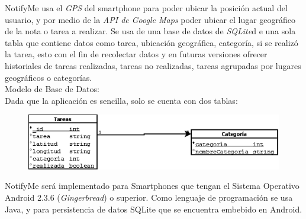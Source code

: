 \documentclass[a4paper,11pt]{article}
\begin{document}
NotifyMe usa el \emph{GPS} del smartphone para poder ubicar la posición actual del usuario, y por medio de la \emph{API de Google Maps} poder ubicar el lugar geográfico de la nota o tarea a realizar. Se usa de una base de datos de \emph{SQLite}d e una sola tabla que contiene datos como tarea, ubicación geográfica, categoría, si se realizó la tarea, esto con el fin de recolectar datos y en futuras versiones ofrecer historiales de tareas realizadas, tareas no realizadas, tareas agrupadas por lugares geográficos o categorías. \\
 
Modelo de Base de Datos: \\

Dada que la aplicación es sencilla, solo se cuenta con dos tablas: \\

\begin{figure}[h]
\centering
\includegraphics[width=0.7\linewidth]{./DB}
\caption{}
\label{fig 1: Modelo ER de Base de Datos de NotifyMe}
\end{figure}

NotifyMe será implementado para Smartphones que tengan el Sistema Operativo Android 2.3.6 (\emph{Gingerbread}) o superior. Como lenguaje de programación se usa Java, y para persistencia de datos SQLite que se encuentra embebido en Android.
\end{document}
